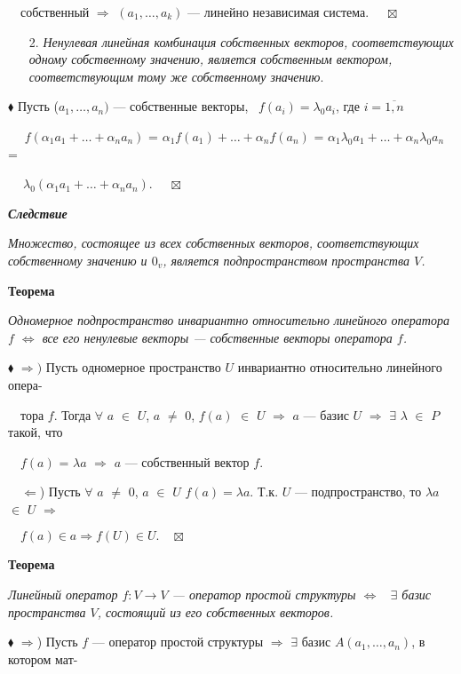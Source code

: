 \documentclass[a4paper, 12pt]{report}
\begin{document}
	$\quad$собственный $\Rightarrow$ $(a_1, \dots, a_k)$ --- линейно независимая система. $\quad \boxtimes$
	\begin{enumerate}
		\item[2.] \textit{Ненулевая линейная комбинация собственных векторов, соответствующих одному собственному значению, является собственным вектором, соответствующим тому же собственному значению}.
	\end{enumerate}
	
	$\blacklozenge$ Пусть ($a_1, \dots, a_n)$ --- собственные векторы, \ $f(a_i) = \lambda_0 a_i$, где $i = \overline{1,n}$ 
	
	$\quad$ $f(\alpha_1a_1 + \ldots + \alpha_na_n)$ = $\alpha_1 f(a_1) + \ldots + \alpha_n f(a_n)$ = $\alpha_1 \lambda_0a_1 + \ldots + \alpha_n \lambda_0 a_n$ = 
	
	$\quad\ \lambda_0(\alpha_1 a_1 + \ldots + \alpha_n a_n)$. $\quad \boxtimes$
	
	
	
	\par\bigskip
	\textit{\textbf{Следствие}}
	
	\textit{Множество, состоящее из всех собственных векторов, соответствующих собственному значению и $0_v$, является подпространством пространства $V$.}
	
	\par\bigskip
	\textbf{Теорема}
	
	\textit{Одномерное подпространство инвариантно относительно линейного оператора $f$ $\Longleftrightarrow$ все его ненулевые векторы --- собственные векторы оператора $f$.}
	\par\bigskip
	$\blacklozenge$ $\Rightarrow)$ Пусть одномерное пространство $U$ инвариантно относительно линейного опера-
	
	$\quad$тора $f$. Тогда  $\forall$ $a$ $\in$ $U$, $a$ $\not=$ 0, $f(a)$ $\in$ $U$ $\Rightarrow$ $a$ --- базис $U$ $\Rightarrow$ $\exists$ $\lambda$ $\in$ $P$ такой, что
	
	$\quad$$f(a)$ = $\lambda$$a$ $\Rightarrow$ $a$ --- собственный вектор $f$.
	
	$\quad \Leftarrow$) Пусть $\forall$ $a$ $\not=$ 0, $a$ $\in$ $U$ $f(a) = \lambda a$. Т.к. $U$ --- подпространство, то $\lambda a$ $\in$ $U$ $\Rightarrow$
	
	$\quad f(a) \in a \Rightarrow f(U) \in U. \quad \boxtimes$
	
	\par\bigskip
	\textbf{Теорема}
	
	\textit{Линейный оператор $f:V \rightarrow V$ --- оператор простой структуры $\Longleftrightarrow$ \ $\exists$ базис пространства $V$, состоящий из его собственных векторов.}
	\par\bigskip
	$\blacklozenge$ $\Rightarrow$) Пусть $f$ --- оператор простой структуры $\Rightarrow$ $\exists$ базис $A(a_1, \dots, a_n)$, в котором мат-
	
\end{document}
